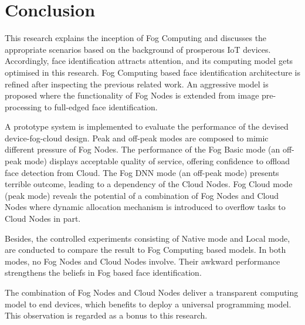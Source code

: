 \chapter{Conclusion} \label{chap:conclusion}

This research explains the inception of Fog Computing and discusses the appropriate scenarios based on the background of prosperous IoT devices. Accordingly, face identification attracts attention, and its computing model gets optimised in this research. Fog Computing based face identification architecture is refined after inspecting the previous related work. An aggressive model is proposed where the functionality of Fog Nodes is extended from image pre-processing to full-edged face identification.

A prototype system is implemented to evaluate the performance of the devised device-fog-cloud design. Peak and off-peak modes are composed to mimic different pressure of Fog Nodes. The performance of the Fog Basic mode (an off-peak mode) displays acceptable quality of service, offering confidence to offload face detection from Cloud. The Fog DNN mode (an off-peak mode) presents terrible outcome, leading to a dependency of the Cloud Nodes. Fog Cloud mode (peak mode) reveals the potential of a combination of Fog Nodes and Cloud Nodes where dynamic allocation mechanism is introduced to overflow tasks to Cloud Nodes in part.

Besides, the controlled experiments consisting of Native mode and Local mode, are conducted to compare the result to Fog Computing based models. In both modes, no Fog Nodes and Cloud Nodes involve. Their awkward performance strengthens the beliefs in Fog based face identification.

The combination of Fog Nodes and Cloud Nodes deliver a transparent computing model to end devices, which benefits to deploy a universal programming model. This observation is regarded as a bonus to this research.